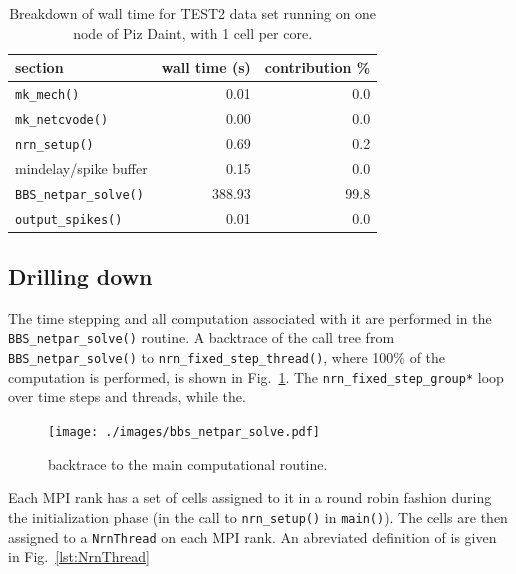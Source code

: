 \documentclass[11pt,a4paper]{article}
\newcommand{\lst}[1]{\lstinline!#1!}
\newcommand{\fig}[1]{Fig.~\ref{#1}}
\begin{document}
\begin{table}[htp!]
    \centering
\begin{tabular}{lrr}
\hline
section                    &    wall time (s) & contribution \% \\
\hline
\lst{mk_mech()}            &    0.01   &    0.0\\
\lst{mk_netcvode()}        &    0.00   &    0.0\\
\lst{nrn_setup()}          &    0.69   &    0.2\\
mindelay/spike buffer      &    0.15   &    0.0\\
\lst{BBS_netpar_solve()}   &    388.93 &   99.8\\
\lst{output_spikes()}      &    0.01   &    0.0\\
\hline
\end{tabular}
\label{tbl:wallmain}
\caption{Breakdown of wall time for TEST2 data set running on one node of Piz Daint, with 1 cell per core.}
\end{table}

\subsection{Drilling down}
The time stepping and all computation associated with it are performed in the \lst{BBS_netpar_solve()} routine. A backtrace of the call tree from \lst{BBS_netpar_solve()} to \lst{nrn_fixed_step_thread()}, where 100\% of the computation is performed, is shown in \fig{fig:bbsnetpar}. The \lst{nrn_fixed_step_group*} loop over time steps and threads, while the.

\begin{figure}[htp!]
\centering
\texttt{[image: ./images/bbs\_netpar\_solve.pdf]}
\caption{backtrace to the main computational routine.}
\label{fig:bbsnetpar}
\end{figure}

Each MPI rank has a set of cells assigned to it in a round robin fashion during the initialization phase (in the call to \lst{nrn_setup()} in \lst{main()}). The cells are then assigned to a \lst{NrnThread} on each MPI rank. An abreviated definition of is given in \fig{lst:NrnThread}
\end{document}
